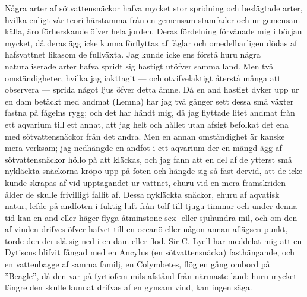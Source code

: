 Några arter af sötvattensnäckor hafva mycket stor spridning och beslägtade arter, hvilka enligt vår teori härstamma från en gemensam stamfader och ur gemensam källa, äro förherskande öfver hela jorden. Deras fördelning förvånade mig i början mycket, då deras ägg icke kunna förflyttas af fåglar och omedelbarligen dödas af hafsvattnet likasom de fullväxta. Jag kunde icke ens förstå huru några naturaliserade arter hafva spridt sig hastigt utöfver samma land. Men två omständigheter, hvilka jag iakttagit — och otvifvelaktigt återstå många att observera — sprida något ljus öfver detta ämne. Då en and hastigt dyker upp ur en dam betäckt med andmat (Lemna) har jag två gånger sett dessa små växter fastna på fågelns rygg; och det har händt mig, då jag flyttade litet andmat från ett aqvarium till ett annat, att jag helt och hållet utan afsigt befolkat det ena med sötvattensnäckor från det andra. Men en annan omständighet är kanske mera verksam; jag nedhängde en andfot i ett aqvarium der en mängd ägg af sötvattensnäckor höllo på att kläckas, och jag fann att en del af de ytterst små nykläckta snäckorna kröpo upp på foten och hängde sig så fast dervid, att de icke kunde skrapas af vid upptagandet ur vattnet, ehuru vid en mera framskriden ålder de skulle frivilligt fallit af. Dessa nykläckta snäckor, ehuru af aqvatisk natur, lefde på andfoten i fuktig luft från tolf till tjugu timmar och under denna tid kan en and eller häger flyga åtminstone sex- eller sjuhundra mil, och om den af vinden drifves öfver hafvet till en oceanö eller någon annan aflägsen punkt, torde den der slå sig ned i en dam eller flod. Sir C. Lyell har meddelat mig att en Dytiscus blifvit fångad med en Ancylus (en sötvattensnäcka) fasthängande, och en vattenbagge af samma familj, en Colymbetes, flög en gång ombord på ”Beagle”, då den var på fyrtiofem mils afstånd från närmaste land: huru mycket längre den skulle kunnat drifvas af en gynsam vind, kan ingen säga.


